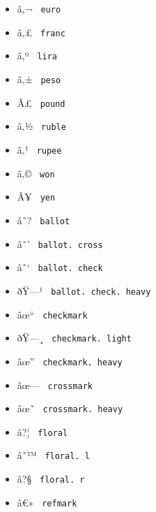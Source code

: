 \begin{itemize}
\item
  \label{symbol-euro}{{ â‚¬ } \texttt{\ euro\ }}
\item
  \label{symbol-franc}{{ â‚£ } \texttt{\ franc\ }}
\item
  \label{symbol-lira}{{ â‚º } \texttt{\ lira\ }}
\item
  \label{symbol-peso}{{ â‚± } \texttt{\ peso\ }}
\item
  \label{symbol-pound}{{ Â£ } \texttt{\ pound\ }}
\item
  \label{symbol-ruble}{{ â‚½ } \texttt{\ ruble\ }}
\item
  \label{symbol-rupee}{{ â‚¹ } \texttt{\ rupee\ }}
\item
  \label{symbol-won}{{ â‚© } \texttt{\ won\ }}
\item
  \label{symbol-yen}{{ Â¥ } \texttt{\ yen\ }}
\item
  \label{symbol-ballot}{{ â˜? } \texttt{\ ballot\ }}
\item
  \label{symbol-ballot.cross}{{ â˜' }
  \texttt{\ ballot.\ cross\ }}
\item
  \label{symbol-ballot.check}{{ â˜` }
  \texttt{\ ballot.\ check\ }}
\item
  \label{symbol-ballot.check.heavy}{{ ðŸ---¹ }
  \texttt{\ ballot.\ check.\ heavy\ }}
\item
  \label{symbol-checkmark}{{ âœ`` }
  \texttt{\ checkmark\ }}
\item
  \label{symbol-checkmark.light}{{ ðŸ---¸ }
  \texttt{\ checkmark.\ light\ }}
\item
  \label{symbol-checkmark.heavy}{{ âœ'' }
  \texttt{\ checkmark.\ heavy\ }}
\item
  \label{symbol-crossmark}{{ âœ--- }
  \texttt{\ crossmark\ }}
\item
  \label{symbol-crossmark.heavy}{{ âœ˜ }
  \texttt{\ crossmark.\ heavy\ }}
\item
  \label{symbol-floral}{{ â?¦ } \texttt{\ floral\ }}
\item
  \label{symbol-floral.l}{{ â˜™ }
  \texttt{\ floral.\ l\ }}
\item
  \label{symbol-floral.r}{{ â?§ }
  \texttt{\ floral.\ r\ }}
\item
  \label{symbol-refmark}{{ â€» } \texttt{\ refmark\ }}

\end{itemize}
